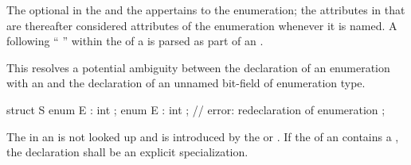 The optional  in the  and
the  appertains to the enumeration; the attributes
in that  are thereafter considered attributes of the
enumeration whenever it is named.
A \tcode{:} following
``  ''
within the  of a 
is parsed as part of an .
\begin{note}
This resolves a potential ambiguity between the declaration of an enumeration
with an  and the declaration of an unnamed bit-field of enumeration
type.
\begin{example}
\begin{codeblock}
struct S {
  enum E : int {};
  enum E : int {};              // error: redeclaration of enumeration
};
\end{codeblock}

\end{example}
\end{note}
The  in an 
is not looked up and is introduced by
the  or .
If the  of an  contains
a ,
the declaration shall be an explicit specialization.

